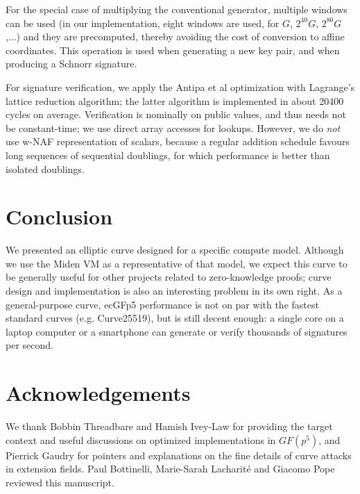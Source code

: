 \documentclass{llncs}
\newcommand{\GF}{GF}
\begin{document}
For the special case of multiplying the conventional generator, multiple
windows can be used (in our implementation, eight windows are used, for
$G$, $2^{40} G$, $2^{80} G$,...) and they are precomputed, thereby
avoiding the cost of conversion to affine coordinates. This operation is
used when generating a new key pair, and when producing a Schnorr
signature.

For signature verification, we apply the Antipa et al
optimization\cite{AntBroGalLamStrVan2005} with Lagrange's lattice
reduction algorithm\cite{Por2020-2}; the latter algorithm is implemented
in about 20400 cycles on average. Verification is nominally on public
values, and thus needs not be constant-time; we use direct array
accesses for lookups. However, we do \emph{not} use w-NAF representation
of scalars, because a regular addition schedule favours long sequences
of sequential doublings, for which performance is better than isolated
doublings.

\section{Conclusion}

We presented an elliptic curve designed for a specific compute model.
Although we use the Miden VM as a representative of that model, we
expect this curve to be generally useful for other projects related to
zero-knowledge proofs; curve design and implementation is also an
interesting problem in its own right. As a general-purpose curve, ecGFp5
performance is not on par with the fastest standard curves (e.g.
Curve25519), but is still decent enough: a single core on a laptop
computer or a smartphone can generate or verify thousands of signatures
per second.

\section*{Acknowledgements}

We thank Bobbin Threadbare and Hamish Ivey-Law for providing the target
context and useful discussions on optimized implementations in
$\GF(p^5)$, and Pierrick Gaudry for pointers and explanations on the
fine details of curve attacks in extension fields. Paul Bottinelli,
Marie-Sarah Lacharité and Giacomo Pope reviewed this manuscript.
\end{document}
